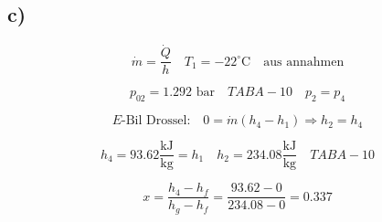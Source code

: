 

\subsection*{c)}

\[
\dot{m} = \frac{\dot{Q}}{h} \quad T_{1} = -22^\circ \text{C} \quad \text{aus annahmen}
\]

\[
p_{02} = 1.292 \text{ bar} \quad TAB A-10 \quad p_2 = p_4
\]

\[
E\text{-Bil Drossel:} \quad 0 = \dot{m} (h_4 - h_1) \Rightarrow h_2 = h_4
\]

\[
h_4 = 93.62 \frac{\text{kJ}}{\text{kg}} = h_1 \quad h_2 = 234.08 \frac{\text{kJ}}{\text{kg}} \quad TAB A-10
\]

\[
x = \frac{h_4 - h_f}{h_g - h_f} = \frac{93.62 - 0}{234.08 - 0} = 0.337
\]